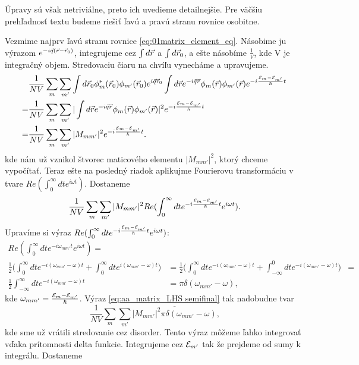 Úpravy sú však netriviálne, preto ich uvedieme detailnejšie. Pre väčšiu prehľadnosť textu budeme riešiť ľavú a
pravú stranu rovnice osobitne. 
 
 Vezmime najprv ľavú stranu rovnice \eqref{eq:01matrix_element_eq}. Násobime ju výrazom $e^{-i\vec{q}(\vec{r}-\vec{r}_0)}$, integrujeme cez $\int d\vec{r}$ a $\int d\vec{r}_0$, a ešte násobíme $\frac{1}{V}$, kde V je integračný objem. 
Stredovaciu čiaru na chvíľu vynecháme a upravujeme.
\begin{align*}
&\frac{1}{NV}\sum_m \sum_{m'} \int d\vec{r}_0  \phi_m^*(\vec{r}_0)\phi_{m'}(\vec{r}_0) e^{i\vec{q}\vec{r}_0} \int d\vec{r} e^{-i\vec{q}\vec{r}}\phi_m(\vec{r})\phi_{m'}(\vec{r})e^{-i\frac{\mathcal{E}_m-\mathcal{E}_{m'}}{\hbar}t} \\
=&\frac{1}{NV}\sum_m \sum_{m'}|\int d\vec{r} e^{-i\vec{q}\vec{r}}\phi_m(\vec{r})\phi_{m'}(\vec{r})|^2 e^{-i\frac{\mathcal{E}_m-\mathcal{E}_{m'}}{\hbar}t}\\
=&\frac{1}{NV}\sum_m \sum_{m'} |M_{mm'}|^2 e^{-i\frac{\mathcal{E}_m-\mathcal{E}_{m'}}{\hbar}t} \text{.}
\end{align*}
kde nám už vznikol štvorec maticového elementu $|M_{mm'}|^2$, ktorý chceme vypočítať. Teraz ešte na posledný riadok aplikujme Fourierovu transformáciu 
v tvare $Re (\int_0^{\infty} dt e^{i\omega t})$. Dostaneme
\begin{equation}
 \label{eq:aa_matrix_LHS semifinal}
\frac{1}{NV}\sum_m \sum_{m'} |M_{mm'}|^2 Re (\int_0^{\infty} dt e^{-i\frac{\mathcal{E}_m-\mathcal{E}_{m'}}{\hbar}t} e^{i\omega t}) \text{.}
\end{equation}
Upravíme si výraz $Re(\int_0^{\infty} dt e^{-i\frac{\mathcal{E}_m-\mathcal{E}_{m'}}{\hbar}t} e^{i\omega t})$:
\begin{align*}
 Re(\int_0^{\infty} dt e^{-i\omega_{mm'}t} e^{i\omega t})=&\\
 \frac{1}{2} \bigl(\int_0^{\infty} dt e^{-i(\omega_{mm'}-\omega)t}+\int_0^{\infty} dt e^{i(\omega_{mm'}-\omega)t}\bigr)&=
  \frac{1}{2} \bigl(\int_0^{\infty} dt e^{-i(\omega_{mm'}-\omega)t}+\int_{-\infty}^{0} dt e^{-i(\omega_{mm'}-\omega)t}\bigr)&=\\
  \frac{1}{2} \int_{-\infty}^{\infty} dt e^{-i(\omega_{mm'}-\omega)t}&=\pi \delta(\omega_{mm'}-\omega)\text{,}
\end{align*}
kde $\omega_{mm'}=\frac{\mathcal{E}_m-\mathcal{E}_{m'}}{\hbar}$. Výraz  \eqref{eq:aa_matrix_LHS semifinal} tak nadobudne tvar
\begin{equation}
 \label{eq:aa_matrix_LHS}
 \frac{1}{NV}\sum_m \sum_{m'} \overline{|M_{mm'}|^2 \pi \delta(\omega_{mm'}-\omega)} \text{,}
\end{equation}
kde sme už vrátili stredovanie cez disorder. Tento výraz môžeme ľahko integrovať vďaka prítomnosti delta funkcie. Integrujeme cez $\mathcal{E}_{m'}$ tak že prejdeme od sumy k integrálu. Dostaneme
